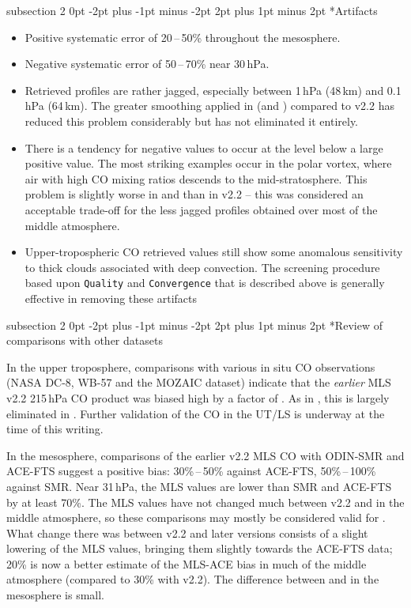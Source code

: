 \documentclass[11pt,draft]{report}
\makeatletter
\renewcommand{\subsection}{\@startsection%
  {subsection}%
  {2}%
  {0pt}%
  {-2pt plus -1pt minus -2pt}%
  {2pt plus 1pt minus 2pt}%
  {\large\sffamily\fontseries{sb}\selectfont\flushleft\color{SectionColor}\figureversion{tabular}}}%
\makeatother
\begin{document}
\subsection*{Artifacts}
\begin{itemize}
\item Positive systematic error of 20\,--\,50\% throughout the mesosphere.
\item Negative systematic error of 50\,--\,70\% near 30\,hPa.
\item Retrieved profiles are rather jagged, especially between 1\,hPa
  (48\,km) and 0.1\,hPa (64\,km). The greater smoothing applied in
  \thisv (and \prevvSlash) compared to v2.2 has reduced this problem
  considerably but has not eliminated it entirely.
\item There is a tendency for negative values to occur at the level
  below a large positive value. The most striking examples occur in the
  polar vortex, where air with high CO mixing ratios descends to the
  mid-stratosphere.  This problem is slightly worse in \thisv and
  \prevvSlash than in v2.2 -- this was considered an acceptable
  trade-off for the less jagged profiles obtained over most of the
  middle atmosphere.
\item Upper-tropospheric \thisv CO retrieved values still show some
  anomalous sensitivity to thick clouds associated with deep convection.
  The screening procedure based upon \texttt{Quality} and
  \texttt{Convergence} that is described above is generally effective in
  removing these artifacts
\end{itemize}

\subsection*{Review of comparisons with other datasets}

In the upper troposphere, comparisons with various in situ CO
observations (NASA DC-8, WB-57 and the MOZAIC dataset) indicate that the
\emph{earlier} MLS v2.2 215\,hPa CO product was biased high by a factor
of . As in \prevv, this is largely eliminated in \thisv.
Further validation of the \thisv CO in the UT/LS is underway at the time
of this writing.

In the mesosphere, comparisons of the earlier v2.2 MLS CO with ODIN-SMR
and ACE-FTS suggest a positive bias: 30\%\,--\,50\% against ACE-FTS,
50\%\,--\,100\% against SMR. Near 31\,hPa, the MLS values are lower than
SMR and ACE-FTS by at least 70\%. The MLS values have not changed much
between v2.2 and \thisv in the middle atmosphere, so these comparisons
may mostly be considered valid for \thisv.  What change there was
between v2.2 and later versions consists of a slight lowering of the MLS
values, bringing them slightly towards the ACE-FTS data; 20\% is now a
better estimate of the MLS-ACE bias in much of the middle atmosphere
(compared to 30\% with v2.2). The difference between \prevvSlash and
\thisv in the mesosphere is small.
\end{document}
